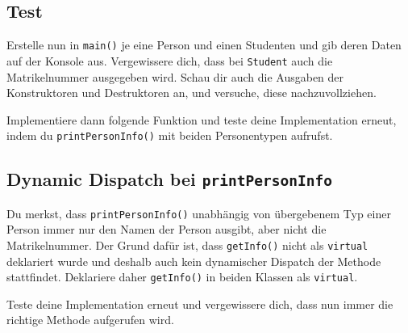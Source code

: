 \subsection{Test}
Erstelle nun in \lstinline{main()} je eine Person und einen Studenten und gib deren Daten auf der Konsole aus.
Vergewissere dich, dass bei \lstinline{Student} auch die Matrikelnummer ausgegeben wird.
Schau dir auch die Ausgaben der Konstruktoren und Destruktoren an, und versuche, diese nachzuvollziehen.

Implementiere dann folgende Funktion und teste deine Implementation erneut, indem du \lstinline{printPersonInfo()} mit beiden Personentypen aufrufst.




\subsection{Dynamic Dispatch bei \lstinline{printPersonInfo}}
Du merkst, dass \lstinline{printPersonInfo()} unabhängig von übergebenem Typ einer Person immer nur den Namen der Person ausgibt, aber nicht die Matrikelnummer.
Der Grund dafür ist, dass \lstinline{getInfo()} nicht als \lstinline{virtual} deklariert wurde und deshalb auch kein dynamischer Dispatch der Methode stattfindet.
Deklariere daher \lstinline{getInfo()} in beiden Klassen als \lstinline{virtual}.

Teste deine Implementation erneut und vergewissere dich, dass nun immer die richtige Methode aufgerufen wird.


